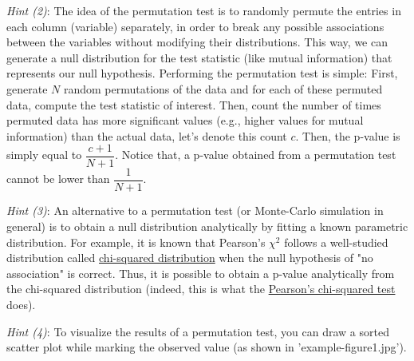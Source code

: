 \documentclass[11pt]{article}
\begin{document}
\vspace{0.15cm}
\noindent
\textit{Hint (2)}: The idea of the permutation test is to randomly permute the entries in each column (variable) separately, in order to break any possible associations between the variables without modifying their distributions. This way, we can generate a null distribution for the test statistic (like mutual information) that represents our null hypothesis. Performing the permutation test is simple: First, generate $N$ random permutations of the data and for each of these permuted data, compute the test statistic of interest. Then, count the number of times permuted data has more significant values (e.g., higher values for mutual information) than the actual data, let's denote this count $c$. Then, the p-value is simply equal to $\dfrac{c+1}{N+1}$. Notice that, a p-value obtained from a permutation test cannot be lower than $\dfrac{1}{N+1}$. %

\vspace{0.25cm}
\noindent
\textit{Hint (3)}: An alternative to a permutation test (or Monte-Carlo simulation in general) is to obtain a null distribution analytically by fitting a known parametric distribution. For example, it is known that Pearson's $\chi^2$ follows a well-studied distribution called \href{https://en.wikipedia.org/wiki/Chi-squared_distribution}{chi-squared distribution} when the null hypothesis of "no association" is correct. Thus, it is possible to obtain a p-value analytically from the chi-squared distribution (indeed, this is what the \href{https://en.wikipedia.org/wiki/Pearson\%27s_chi-squared_test\#Testing\_for\_statistical_independence}{Pearson's chi-squared test} does). %

\vspace{0.25cm}
\noindent
\textit{Hint (4)}: To visualize the results of a permutation test, you can draw a sorted scatter plot while marking the observed value (as shown in 'example-figure1.jpg').
\end{document}
